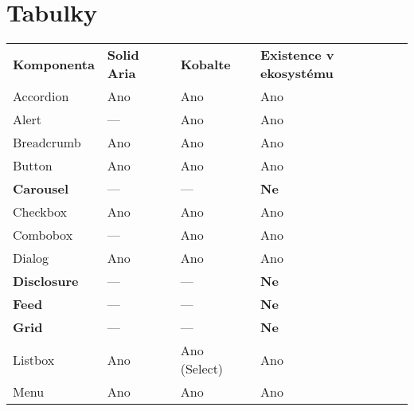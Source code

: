 \documentclass{ctuthesis}
\begin{document}
\printbibliography[keyword={a11y},heading=none]

\chapter{Tabulky}

\begin{table}[ht]
    \begin{tabularx}{\textwidth}{Y Y Y Y}
        \bfseries{Komponenta} & \bfseries{Solid Aria} & \bfseries{Kobalte} & \bfseries{Existence v ekosystému} \\\Midrule{}
        Accordion             & Ano                   & Ano                & Ano                               \\
        Alert                 & ---                   & Ano                & Ano                               \\
        Breadcrumb            & Ano                   & Ano                & Ano                               \\
        Button                & Ano                   & Ano                & Ano                               \\
        \textbf{Carousel}     & ---                   & ---                & \textbf{Ne}                       \\
        Checkbox              & Ano                   & Ano                & Ano                               \\
        Combobox              & ---                   & Ano                & Ano                               \\
        Dialog                & Ano                   & Ano                & Ano                               \\
        \textbf{Disclosure}   & ---                   & ---                & \textbf{Ne}                       \\
        \textbf{Feed}         & ---                   & ---                & \textbf{Ne}                       \\
        \textbf{Grid}         & ---                   & ---                & \textbf{Ne}                       \\
        Listbox               & Ano                   & Ano (Select)       & Ano                               \\
        Menu                  & Ano                   & Ano                & Ano                               \\

\end{tabularx}
\end{table}
\end{document}
